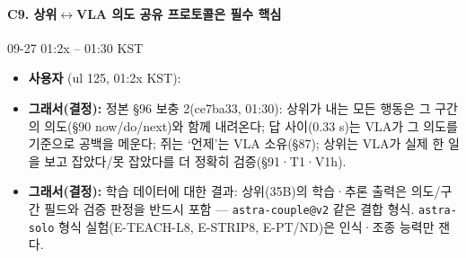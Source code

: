 \paragraph{C9. 상위$\leftrightarrow$VLA 의도 공유 프로토콜은 필수 핵심}
{\small 09-27 01:2x -- 01:30 KST}
\begin{itemize}
  \item \textbf{사용자} (ul 125, 01:2x KST): 
  \item \textbf{그래서(결정):} 정본 §96 보충 2(ce7ba33, 01:30): 상위가 내는 모든 행동은 그 구간의 의도(§90 now/do/next)와 함께 내려온다; 답 사이(0.33 s)는 VLA가 그 의도를 기준으로 공백을 메운다; 쥐는 `언제'는 VLA 소유(§87); 상위는 VLA가 실제 한 일을 보고 잡았다/못 잡았다를 더 정확히 검증(§91·T1·V1h).
  \item \textbf{그래서(결정):} 학습 데이터에 대한 결과: 상위(35B)의 학습·추론 출력은 의도/구간 필드와 검증 판정을 반드시 포함 --- \texttt{astra-\allowbreak{}couple@v2} 같은 결합 형식. \texttt{astra-\allowbreak{}solo} 형식 실험(E-TEACH-L8, E-STRIP8, E-PT/ND)은 인식·조종 능력만 잰다.
\end{itemize}

